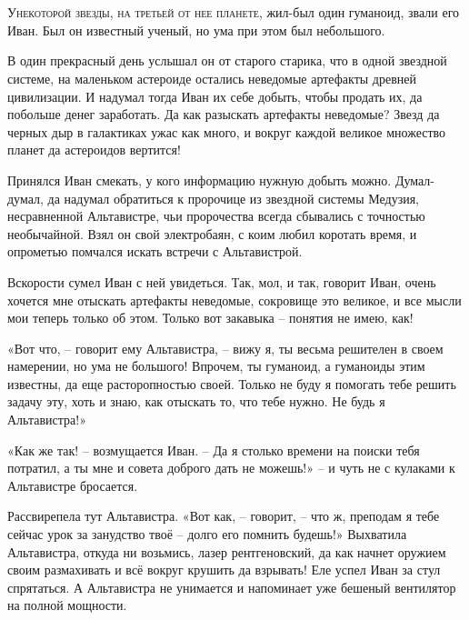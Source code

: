 \documentclass[ebook,oneside,final,openright]{memoir}
\begin{document}
\chapter{}
 \lettrine{У}{некоторой звезды, на третьей от нее планете,} жил-был один гуманоид, звали его Иван. Был он известный ученый, но ума при этом был небольшого.\par
\par
В один прекрасный день услышал он от старого старика, что в одной звездной системе, на маленьком астероиде остались неведомые артефакты древней цивилизации. И надумал тогда Иван их себе добыть, чтобы продать их, да побольше денег заработать. Да как разыскать артефакты неведомые? Звезд да черных дыр в галактиках ужас как много, и вокруг каждой великое множество планет да астероидов вертится!\par
\par
Принялся Иван смекать, у кого информацию нужную добыть можно. Думал-думал, да надумал обратиться к пророчице из звездной системы Медузия, несравненной Альтавистре, чьи пророчества всегда сбывались с точностью необычайной. Взял он свой электробаян, с коим любил коротать время, и опрометью помчался искать встречи с Альтавистрой.\par
\par
Вскорости сумел Иван с ней увидеться. Так, мол, и так, говорит Иван, очень хочется мне отыскать артефакты неведомые, сокровище это великое, и все мысли мои теперь только об этом. Только вот закавыка – понятия не имею, как!\par
\par
«Вот что, – говорит ему Альтавистра, – вижу я, ты весьма решителен в своем намерении, но ума не большого! Впрочем, ты гуманоид, а гуманоиды этим известны, да еще расторопностью своей. Только не буду я помогать тебе решить задачу эту, хоть и знаю, как отыскать то, что тебе нужно. Не будь я Альтавистра!» \par
\par
«Как же так! – возмущается Иван. – Да я столько времени на поиски тебя потратил, а ты мне и совета доброго дать не можешь!» – и чуть не с кулаками к Альтавистре бросается. \par
\par
Рассвирепела тут Альтавистра. «Вот как, – говорит, – что ж, преподам я тебе сейчас урок за занудство твоё – долго его помнить будешь!» Выхватила Альтавистра, откуда ни возьмись, лазер рентгеновский, да как начнет оружием своим размахивать и всё вокруг крушить да взрывать! Еле успел Иван за стул спрятаться. А Альтавистра не унимается и напоминает уже бешеный вентилятор на полной мощности. \par
\end{document}
